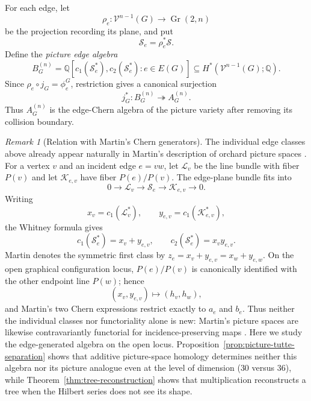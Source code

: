 \documentclass[11pt]{amsart}
\theoremstyle{plain}
\theoremstyle{definition}
\theoremstyle{remark}
\newtheorem{remark}[theorem]{Remark}
\newcommand{\Q}{\mathbb{Q}}
\newcommand{\Gr}{\operatorname{Gr}}
\begin{document}
For each edge, let
\[
  \rho_e:\mathcal V^{n-1}(G)\longrightarrow\Gr(2,n)
\]
be the projection recording its plane, and put
\[
  \mathcal S_e=\rho_e^*\mathcal S.
\]
Define the \emph{picture edge algebra}
\[
  B_G^{(n)}
  =\Q[c_1(\mathcal S_e^*),c_2(\mathcal S_e^*):e\in E(G)]
  \subseteq H^*(\mathcal V^{n-1}(G);\Q).
\]
Since $\rho_e\circ j_G=\phi_e^G$, restriction gives a canonical surjection
\begin{equation}\label{eq:picture-to-open-edge-algebra}
  j_G^*:B_G^{(n)}\twoheadrightarrow A_G^{(n)}.
\end{equation}
Thus $A_G^{(n)}$ is the edge-Chern algebra of the picture variety after
removing its collision boundary.

\begin{remark}[Relation with Martin's Chern generators]
The individual edge classes above already appear naturally in Martin's
description of orchard picture spaces \cite[Theorem~17 and \S7.2]{MartinTopology}.
For a vertex $v$ and an incident edge $e=vw$, let $\mathcal L_v$ be the
line bundle with fiber $P(v)$ and let $\mathcal K_{e,v}$ have fiber
$P(e)/P(v)$.  The edge-plane bundle fits into
\[
  0\longrightarrow \mathcal L_v\longrightarrow \mathcal S_e
  \longrightarrow \mathcal K_{e,v}\longrightarrow0.
\]
Writing
\[
  x_v=c_1(\mathcal L_v^*),\qquad
  y_{e,v}=c_1(\mathcal K_{e,v}^*),
\]
the Whitney formula gives
\[
  c_1(\mathcal S_e^*)=x_v+y_{e,v},\qquad
  c_2(\mathcal S_e^*)=x_vy_{e,v}.
\]
Martin denotes the symmetric first class by
$z_e=x_v+y_{e,v}=x_w+y_{e,w}$.  On the open graphical configuration locus,
$P(e)/P(v)$ is canonically identified with the other endpoint line $P(w)$;
hence
\[
  (x_v,y_{e,v})\longmapsto(h_v,h_w),
\]
and Martin's two Chern expressions restrict exactly to $a_e$ and $b_e$.
Thus neither the individual classes nor functoriality alone is new: Martin's
picture spaces are likewise contravariantly functorial for
incidence-preserving maps \cite[Remark~8]{MartinTopology}.  Here we study the
edge-generated algebra on the open locus.  Proposition~\ref{prop:picture-tutte-separation}
shows that additive picture-space homology determines neither this algebra nor
its picture analogue even at the level of dimension ($30$ versus $36$), while
Theorem~\ref{thm:tree-reconstruction} shows that multiplication reconstructs a
tree when the Hilbert series does not see its shape.
\end{remark}
\end{document}
